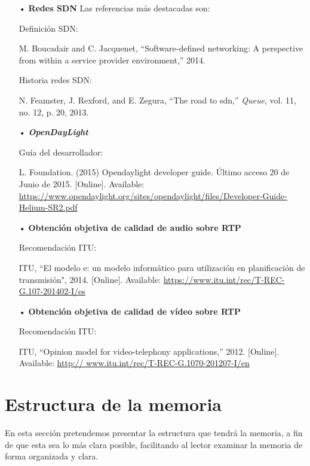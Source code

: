 \documentclass[a4paper,11pt]{book}
\begin{document}
\begin{itemize}
\item[•] \textbf{Redes \ac{SDN}}
Las referencias más destacadas son:

Definición \ac{SDN}: 

\cite{boucadair2014software} M. Boucadair and C. Jacquenet, ``Software-defined networking: A perspective from within
a service provider environment,” 2014.

Historia redes \ac{SDN}: 

\cite{feamster2013road}  N. Feamster, J. Rexford, and E. Zegura, ``The road to sdn,” \textit{Queue}, vol. 11, no. 12, p. 20, 2013.


\item[•] \textbf{\emph{OpenDayLight}}

Guía del desarrollador: 

\cite{developerGuide}  L. Foundation. (2015) Opendaylight developer guide. Último acceso 20 de Junio de 2015. [Online]. Available: \url{https://www.opendaylight.org/sites/opendaylight/files/Developer-Guide-Helium-SR2.pdf}

\item[•] \textbf{Obtención objetiva de calidad de audio sobre \ac{RTP}}

Recomendación ITU: 

\cite{g107}  ITU, ``El modelo e: un modelo informático para utilización en planificación de transmisión",
2014. [Online]. Available: \url{https://www.itu.int/rec/T-REC-G.107-201402-I/es}

\item[•] \textbf{Obtención objetiva de calidad de vídeo sobre \ac{RTP}}

Recomendación ITU: 

\cite{g1070}  ITU, ``Opinion model for video-telephony applications,” 2012. [Online]. Available: \url{http://
www.itu.int/rec/T-REC-G.1070-201207-I/en}


\end{itemize}

\section{Estructura de la memoria}
En esta sección pretendemos presentar la estructura que tendrá la memoria, a fin de que esta sea lo más clara posible, facilitando al lector examinar la memoria de forma organizada y clara.
\end{document}
